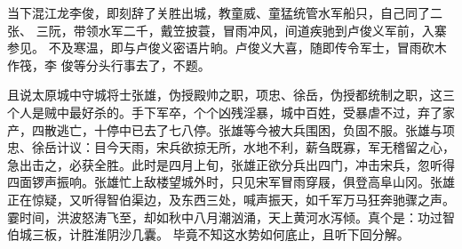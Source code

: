 当下混江龙李俊，即刻辞了关胜出城，教童威、童猛统管水军船只，自己同了二张、
三阮，带领水军二千，戴笠披蓑，冒雨冲风，间道疾驰到卢俊义军前，入寨参见。
不及寒温，即与卢俊义密语片晌。卢俊义大喜，随即传令军士，冒雨砍木作筏，李
俊等分头行事去了，不题。

且说太原城中守城将士张雄，伪授殿帅之职，项忠、徐岳，伪授都统制之职，这三
个人是贼中最好杀的。手下军卒，个个凶残淫暴，城中百姓，受暴虐不过，弃了家
产，四散逃亡，十停中已去了七八停。张雄等今被大兵围困，负固不服。张雄与项
忠、徐岳计议：目今天雨，宋兵欲掠无所，水地不利，薪刍既寡，军无稽留之心，
急出击之，必获全胜。此时是四月上旬，张雄正欲分兵出四门，冲击宋兵，忽听得
四面锣声振响。张雄忙上敌楼望城外时，只见宋军冒雨穿屐，俱登高阜山冈。张雄
正在惊疑，又听得智伯渠边，及东西三处，喊声振天，如千军万马狂奔驰骤之声。
霎时间，洪波怒涛飞至，却如秋中八月潮汹涌，天上黄河水泻倾。真个是：功过智
伯城三板，计胜淮阴沙几囊。
毕竟不知这水势如何底止，且听下回分解。